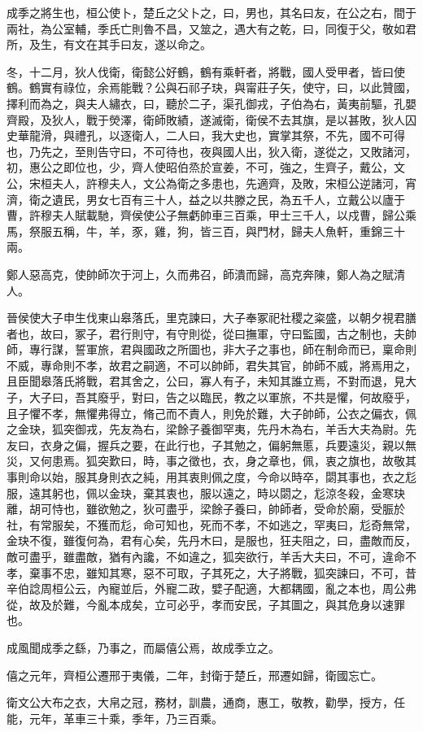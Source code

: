 \begin{pinyinscope}
成季之將生也，桓公使卜，楚丘之父卜之，曰，男也，其名曰友，在公之右，間于兩社，為公室輔，季氏亡則魯不昌，又筮之，遇大有之乾，曰，同復于父，敬如君所，及生，有文在其手曰友，遂以命之。

冬，十二月，狄人伐衛，衛懿公好鶴，鶴有乘軒者，將戰，國人受甲者，皆曰使鶴。鶴實有祿位，余焉能戰？公與石祁子玦，與甯莊子矢，使守，曰，以此贊國，擇利而為之，與夫人繡衣，曰，聽於二子，渠孔御戎，子伯為右，黃夷前驅，孔嬰齊殿，及狄人，戰于熒澤，衛師敗績，遂滅衛，衛侯不去其旗，是以甚敗，狄人囚史華龍滑，與禮孔，以逐衛人，二人曰，我大史也，實掌其祭，不先，國不可得也，乃先之，至則告守曰，不可待也，夜與國人出，狄入衛，遂從之，又敗諸河，初，惠公之即位也，少，齊人使昭伯烝於宣姜，不可，強之，生齊子，戴公，文公，宋桓夫人，許穆夫人，文公為衛之多患也，先適齊，及敗，宋桓公逆諸河，宵濟，衛之遺民，男女七百有三十人，益之以共滕之民，為五千人，立戴公以廬于曹，許穆夫人賦載馳，齊侯使公子無虧帥車三百乘，甲士三千人，以戍曹，歸公乘馬，祭服五稱，牛，羊，豕，雞，狗，皆三百，與門材，歸夫人魚軒，重錦三十兩。

鄭人惡高克，使帥師次于河上，久而弗召，師潰而歸，高克奔陳，鄭人為之賦清人。

晉侯使大子申生伐東山皋落氏，里克諫曰，大子奉冢祀社稷之粢盛，以朝夕視君膳者也，故曰，冢子，君行則守，有守則從，從曰撫軍，守曰監國，古之制也，夫帥師，專行謀，誓軍旅，君與國政之所圖也，非大子之事也，師在制命而已，稟命則不威，專命則不孝，故君之嗣適，不可以帥師，君失其官，帥師不威，將焉用之，且臣聞皋落氏將戰，君其舍之，公曰，寡人有子，未知其誰立焉，不對而退，見大子，大子曰，吾其廢乎，對曰，告之以臨民，教之以軍旅，不共是懼，何故廢乎，且子懼不孝，無懼弗得立，脩己而不責人，則免於難，大子帥師，公衣之偏衣，佩之金玦，狐突御戎，先友為右，梁餘子養御罕夷，先丹木為右，羊舌大夫為尉。先友曰，衣身之偏，握兵之要，在此行也，子其勉之，偏躬無慝，兵要遠災，親以無災，又何患焉。狐突歎曰，時，事之徵也，衣，身之章也，佩，衷之旗也，故敬其事則命以始，服其身則衣之純，用其衷則佩之度，今命以時卒，閟其事也，衣之尨服，遠其躬也，佩以金玦，棄其衷也，服以遠之，時以閟之，尨涼冬殺，金寒玦離，胡可恃也，雖欲勉之，狄可盡乎，梁餘子養曰，帥師者，受命於廟，受脤於社，有常服矣，不獲而尨，命可知也，死而不孝，不如逃之，罕夷曰，尨奇無常，金玦不復，雖復何為，君有心矣，先丹木曰，是服也，狂夫阻之，曰，盡敵而反，敵可盡乎，雖盡敵，猶有內讒，不如違之，狐突欲行，羊舌大夫曰，不可，違命不孝，棄事不忠，雖知其寒，惡不可取，子其死之，大子將戰，狐突諫曰，不可，昔辛伯諗周桓公云，內寵並后，外寵二政，嬖子配適，大都耦國，亂之本也，周公弗從，故及於難，今亂本成矣，立可必乎，孝而安民，子其圖之，與其危身以速罪也。

成風聞成季之繇，乃事之，而屬僖公焉，故成季立之。

僖之元年，齊桓公遷邢于夷儀，二年，封衛于楚丘，邢遷如歸，衛國忘亡。

衛文公大布之衣，大帛之冠，務材，訓農，通商，惠工，敬教，勸學，授方，任能，元年，革車三十乘，季年，乃三百乘。


\end{pinyinscope}